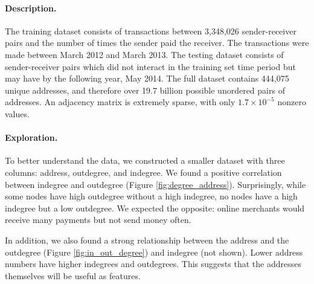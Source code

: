 \documentclass{article} %
\begin{document}
\paragraph{Description.} The training dataset consists of transactions between 3,348,026 sender-receiver pairs and the number of times the sender paid the receiver. The transactions were made between March 2012 and March 2013. The testing dataset consists of sender-receiver pairs which did not interact in the training set time period but may have by the following year, May 2014. The full dataset contains 444,075 unique addresses, and therefore over 19.7 billion possible unordered pairs of addresses. An adjacency matrix is extremely sparse, with only $1.7 \times 10^{-5}$ nonzero values.

\paragraph{Exploration.} To better understand the data, we constructed a smaller dataset with three columns: address, outdegree, and indegree. We found a positive correlation between indegree and outdegree (Figure \ref{fig:degree_address}). Surprisingly, while some nodes have high outdegree without a high indegree, no nodes have a high indegree but a low outdegree. We expected the opposite: online merchants would receive many payments but not send money often.

In addition, we also found a strong relationship between the address and the outdegree (Figure \ref{fig:in_out_degree}) and indegree (not shown). Lower address numbers have higher indegrees and outdegrees. This suggests that the addresses themselves will be useful as features.
\end{document}
